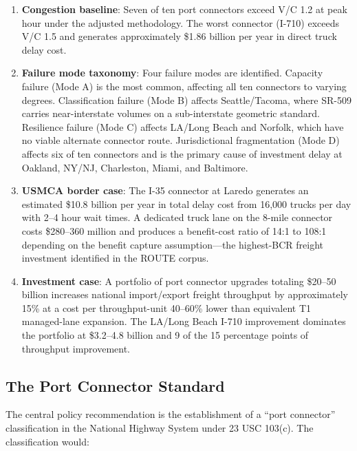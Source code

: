 \begin{enumerate}
  \item \textbf{Congestion baseline}: Seven of ten port connectors exceed V/C 1.2 at peak hour under the adjusted methodology. The worst connector (I-710) exceeds V/C 1.5 and generates approximately \$1.86 billion per year in direct truck delay cost.

  \item \textbf{Failure mode taxonomy}: Four failure modes are identified. Capacity failure (Mode A) is the most common, affecting all ten connectors to varying degrees. Classification failure (Mode B) affects Seattle/Tacoma, where SR-509 carries near-interstate volumes on a sub-interstate geometric standard. Resilience failure (Mode C) affects LA/Long Beach and Norfolk, which have no viable alternate connector route. Jurisdictional fragmentation (Mode D) affects six of ten connectors and is the primary cause of investment delay at Oakland, NY/NJ, Charleston, Miami, and Baltimore.

  \item \textbf{USMCA border case}: The I-35 connector at Laredo generates an estimated \$10.8 billion per year in total delay cost from 16,000 trucks per day with 2--4 hour wait times. A dedicated truck lane on the 8-mile connector costs \$280--360 million and produces a benefit-cost ratio of 14:1 to 108:1 depending on the benefit capture assumption---the highest-BCR freight investment identified in the ROUTE corpus.

  \item \textbf{Investment case}: A portfolio of port connector upgrades totaling \$20--50 billion increases national import/export freight throughput by approximately 15\% at a cost per throughput-unit 40--60\% lower than equivalent T1 managed-lane expansion. The LA/Long Beach I-710 improvement dominates the portfolio at \$3.2--4.8 billion and 9 of the 15 percentage points of throughput improvement.
\end{enumerate}

\subsection{The Port Connector Standard}

The central policy recommendation is the establishment of a ``port connector'' classification in the National Highway System under 23 USC 103(c). The classification would:

